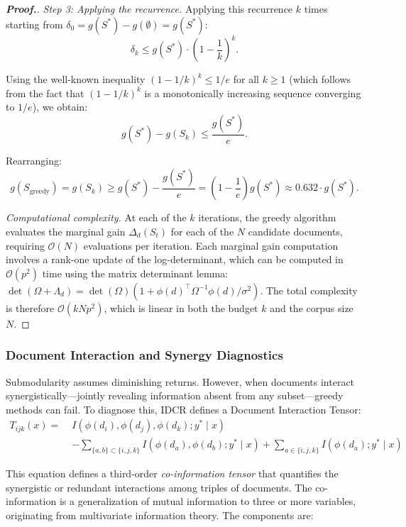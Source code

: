 \documentclass[12pt,a4paper,oneside]{report}
\theoremstyle{definition}
\theoremstyle{remark}
\begin{document}
\begin{proof}[\textbf{Proof.}]
\medskip
\noindent\textit{Step 3: Applying the recurrence.}
Applying this recurrence $k$ times starting from $\delta_0 = g(S^*) - g(\emptyset) = g(S^*)$:
\[
\delta_k \leq g(S^*) \cdot \left(1 - \frac{1}{k}\right)^k.
\]

Using the well-known inequality $(1 - 1/k)^k \leq 1/e$ for all $k \geq 1$ (which follows from the fact that $(1-1/k)^k$ is a monotonically increasing sequence converging to $1/e$), we obtain:
\[
g(S^*) - g(S_k) \leq \frac{g(S^*)}{e}.
\]

Rearranging:
\[
g(S_{\text{greedy}}) = g(S_k) \geq g(S^*) - \frac{g(S^*)}{e} = \left(1 - \frac{1}{e}\right) g(S^*) \approx 0.632 \cdot g(S^*).
\]

\medskip
\noindent\textit{Computational complexity.}
At each of the $k$ iterations, the greedy algorithm evaluates the marginal gain $\Delta_d(S_t)$ for each of the $N$ candidate documents, requiring $\mathcal{O}(N)$ evaluations per iteration. Each marginal gain computation involves a rank-one update of the log-determinant, which can be computed in $\mathcal{O}(p^2)$ time using the matrix determinant lemma: $\det(\Omega + \Lambda_d) = \det(\Omega)(1 + \phi(d)^\top \Omega^{-1} \phi(d) / \sigma^2)$. The total complexity is therefore $\mathcal{O}(kNp^2)$, which is linear in both the budget $k$ and the corpus size $N$.
\end{proof}

\subsubsection{Document Interaction and Synergy Diagnostics}
Submodularity assumes diminishing returns. However, when documents interact synergistically---jointly revealing information absent from any subset---greedy methods can fail. To diagnose this, IDCR defines a Document Interaction Tensor:
\begin{equation} \label{eq:interaction_tensor}
\begin{split}
T_{ijk}(x) = \; & I(\phi(d_i), \phi(d_j), \phi(d_k) ; y^* \mid x) \\
& - \sum_{\{a,b\} \subset \{i,j,k\}} I(\phi(d_a), \phi(d_b) ; y^* \mid x) + \sum_{a \in \{i,j,k\}} I(\phi(d_a) ; y^* \mid x)
\end{split}
\end{equation}

\medskip
\noindent This equation defines a third-order \emph{co-information tensor} that quantifies the synergistic or redundant interactions among triples of documents. The co-information is a generalization of mutual information to three or more variables, originating from multivariate information theory. The components are:
\end{document}
